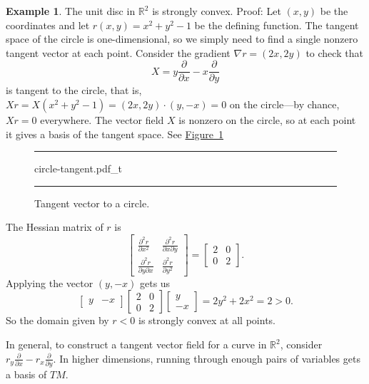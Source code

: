 \documentclass[12pt,openany]{book}
\newcommand{\R}{{\mathbb{R}}}
\theoremstyle{plain}
\theoremstyle{remark}
\theoremstyle{definition}
\newenvironment{myfig}{%
\begin{figure}[h!t]
\noindent\rule{\textwidth}{0.5pt}\vspace{12pt}\par\centering}%
{\par\noindent\rule{\textwidth}{0.5pt}
\end{figure}}
\theoremstyle{exercise}
\theoremstyle{example}
\newtheorem{example}[thm]{Example}
\newcommand{\figureref}[1]{\hyperref[#1]{Figure~\ref*{#1}}}
\begin{document}
\begin{example}
The unit disc in $\R^2$ is strongly convex.
Proof:
Let $(x,y)$ be the coordinates and
let $r(x,y) = x^2+y^2-1$ be the
defining function.
The tangent space of the circle is one-dimensional, so we simply need to
find a single nonzero tangent vector at each point.
Consider the gradient
%
$\nabla r = (2x,2y)$ to check that
\begin{equation*}
X = y \frac{\partial}{\partial x} - x \frac{\partial}{\partial y}
\end{equation*}
is tangent to the circle, that is,
$Xr = X(x^2+y^2-1) = (2x,2y) \cdot (y,-x) = 0$ on the circle---by chance, $Xr=0$ everywhere.
The vector field $X$ is nonzero on the circle, so at each point it gives a
basis of the tangent space.  See \figureref{fig:circle-tangent}
\begin{myfig}
{circle-tangent.pdf_t}
\caption{Tangent vector to a circle.\label{fig:circle-tangent}}
\end{myfig}

The Hessian matrix of $r$ is
\begin{equation*}
\begin{bmatrix}
\frac{\partial^2 r}{\partial x^2} &
\frac{\partial^2 r}{\partial x \partial y} \\
\frac{\partial^2 r}{\partial y \partial x} &
\frac{\partial^2 r}{\partial y^2}
\end{bmatrix}
=
\begin{bmatrix}
2 & 0 \\
0 & 2
\end{bmatrix} .
\end{equation*}
Applying the vector $(y,-x)$ gets us
\begin{equation*}
\begin{bmatrix}
y & -x
\end{bmatrix}
\begin{bmatrix}
2 & 0 \\
0 & 2
\end{bmatrix}
\begin{bmatrix}
y \\ -x
\end{bmatrix}
=
2y^2+2x^2 = 2 > 0 .
\end{equation*}
So the domain given by $r < 0$ is strongly convex at all points.
\end{example}

In general, to construct a tangent vector field for
a curve in $\R^2$,
consider
$r_y \frac{\partial}{\partial x} - r_x \frac{\partial}{\partial y}$.  In
higher dimensions, running through enough pairs of variables gets
a basis of $TM$.
\end{document}
